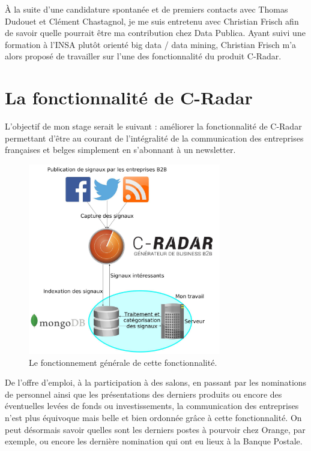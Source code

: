 À la suite d'une candidature spontanée et de premiers contacts avec Thomas Dudouet et Clément Chastagnol, je me suis entretenu avec Christian Frisch afin de savoir quelle pourrait être ma contribution chez Data Publica. Ayant suivi une formation à l'INSA plutôt orienté big data / data mining, Christian Frisch m'a alors proposé de travailler sur l'une des fonctionnalité du produit C-Radar.

\section{La fonctionnalité de C-Radar} %
\label{sec:la_fonctionnalite_de_c_radar}
    L'objectif de mon stage serait le suivant : améliorer la fonctionnalité de C-Radar permettant d'être au courant de l'intégralité de la communication des entreprises françaises et belges simplement en s'abonnant à un newsletter.\\

    \begin{figure}[h!]
        \centering
        \includegraphics[width=0.75\textwidth]{images/capture_process.jpg}
        \caption{Le fonctionnement générale de cette fonctionnalité.}
        \label{fig:capture_process}
    \end{figure}

    De l'offre d'emploi, à la participation à des salons, en passant par les nominations de personnel ainsi que les présentations des derniers produits ou encore des éventuelles levées de fonds ou investissements, la communication des entreprises n'est plus équivoque mais belle et bien ordonnée grâce à cette fonctionnalité. On peut désormais savoir quelles sont les derniers postes à pourvoir chez Orange, par exemple, ou encore les dernière nomination qui ont eu lieux à la Banque Postale.\\

